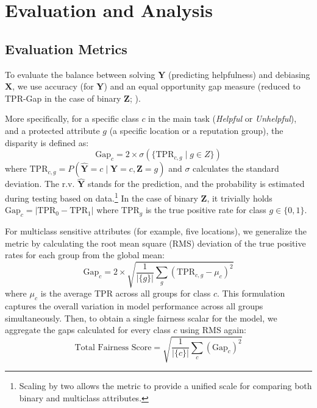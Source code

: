 \documentclass[11pt]{article}
\newcommand{\rv}[1]{\mathbf{#1}}
\begin{document}
\section{Evaluation and Analysis}

\subsection{Evaluation Metrics}
\label{app:evaluation-metrics}
To evaluate the balance between solving $\rv{Y}$ (predicting helpfulness) and debiasing $\rv{X}$, we use accuracy (for $\rv{Y}$) and an equal opportunity gap measure (reduced to TPR-Gap in the case of binary $\rv{Z}$;  \citealt{DeArteaga-2019-biasbios}).

More specifically, for a specific class $c$ in the main task (\textit{Helpful} or \textit{Unhelpful}), and a protected attribute $g$ (a specific location or a reputation group), the disparity is defined as:
\begin{equation}
    \text{Gap}_c = 2 \times \sigma(\{\text{TPR}_{c, g} \mid g \in Z\})
\end{equation}
\noindent where $\text{TPR}_{c, g} = P(\hat{\rv{Y}}=c \mid \rv{Y}=c, \rv{Z}=g)$ and $\sigma$ calculates the standard deviation. The r.v. $\hat{\rv{Y}}$ stands for the prediction, and the probability is estimated during testing based on data.\footnote{Scaling by two allows the metric to provide a unified scale for comparing both binary and multiclass attributes.}
In the case of binary $\rv{Z}$, it trivially holds $\text{Gap}_c = |\text{TPR}_0 - \text{TPR}_1|$
where $\text{TPR}_g$ is the true positive rate for
class $g \in \{ 0, 1 \}$.

For multiclass sensitive attributes (for example, five locations), we generalize the metric by calculating the root mean square (RMS) deviation of the true positive rates for each group from the global mean:
\begin{equation}
    \text{Gap}_c = 2 \times \sqrt{\frac{1}{|\{g\}|} \sum_{g} (\text{TPR}_{c,g} - \mu_c)^2}
\end{equation}
\noindent where $\mu_c$ is the average TPR across all groups for class $c$. This formulation captures the overall variation in model performance across all groups simultaneously.
Then, to obtain a single fairness scalar for the model, we aggregate the gaps calculated for every class $c$ using RMS again:
\begin{equation}
    \text{Total Fairness Score} = \sqrt{ \frac{1}{|\{ c \}|} \sum_{c} (\text{Gap}_c)^2 }
\end{equation}
\end{document}
